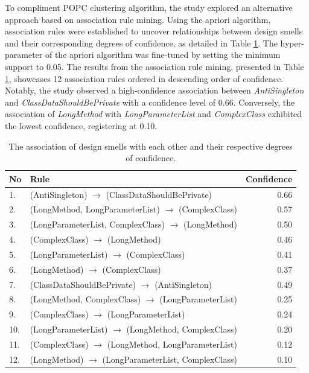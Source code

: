 \documentclass[AMA,Times1COL]{WileyNJDv5} %
\begin{document}
	To compliment POPC clustering algorithm, the study explored an alternative approach based on association rule mining. Using the apriori algorithm, association rules were established to uncover relationships between design smells and their corresponding degrees of confidence, as detailed in Table \ref{table:assoc_ds_ds}. The hyper-parameter of the apriori algorithm was fine-tuned by setting the minimum support to 0.05. The results from the association rule mining, presented in Table \ref{table:assoc_ds_ds}, showcases 12 association rules ordered in descending order of confidence. Notably, the study observed a high-confidence association between \textit{AntiSingleton} and \textit{ClassDataShouldBePrivate} with a confidence level of 0.66. Conversely, the association of \textit{LongMethod} with \textit{LongParameterList} and \textit{ComplexClass} exhibited the lowest confidence, registering at 0.10.
		\begin{table}[h!]
		\centering %
		\caption{The  association of design smells with each other and their respective degrees of confidence.} %
		\begin{tabular*}{350pt}{@{\extracolsep\fill}llr@{\extracolsep\fill}}%
			
			\toprule
			\textbf{No} & \textbf{Rule} &\textbf{ Confidence}  \\
			\midrule
			1. &(AntiSingleton) $\rightarrow$ (ClassDataShouldBePrivate) & 0.66 \\
			2. &(LongMethod, LongParameterList)	 $\rightarrow$ (ComplexClass) & 0.57 \\
			3. &(LongParameterList, ComplexClass) $\rightarrow$ (LongMethod)  & 0.50 \\
			4. &(ComplexClass) $\rightarrow$ (LongMethod) & 0.46 \\
			5. &(LongParameterList)	 $\rightarrow$ (ComplexClass) & 0.41 \\
			6. &(LongMethod) $\rightarrow$ (ComplexClass) & 0.37 \\
			7. &(ClassDataShouldBePrivate) $\rightarrow$ (AntiSingleton) & 0.49 \\
			8. &(LongMethod, ComplexClass) $\rightarrow$ (LongParameterList) & 0.25 \\
			9. &(ComplexClass) $\rightarrow$ (LongParameterList) & 0.24 \\
			10. &(LongParameterList)	 $\rightarrow$ (LongMethod, ComplexClass) & 0.20 \\
			11. &(ComplexClass)	 $\rightarrow$ (LongMethod, LongParameterList) & 0.12 \\
			12. &(LongMethod) $\rightarrow$ (LongParameterList, ComplexClass) & 0.10 \\
			\bottomrule
		\end{tabular*}
		\label{table:assoc_ds_ds}
	\end{table} 
	
\end{document}
